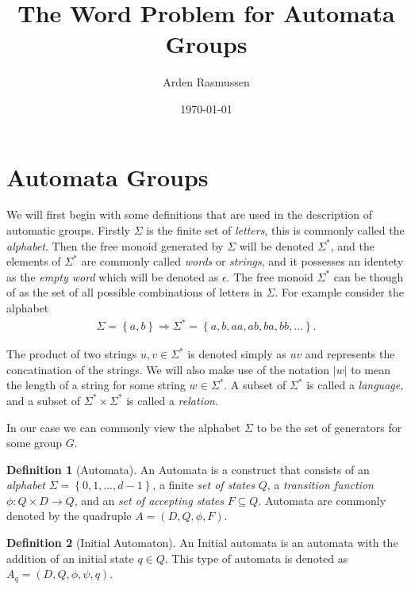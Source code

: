 \documentclass[10pt]{amsart}
\title{The Word Problem for Automata Groups}
\author{Arden Rasmussen}
\date{\today}
\theoremstyle{definition}
\newtheorem{definition}{Definition}[section]
\begin{document}
\maketitle

\section{Automata Groups}%
\label{sec:automata_groups}

We will first begin with some definitions that are used in the description of
automatic groups. Firstly $\Sigma$ is the finite set of \textit{letters}, this
is commonly called the \textit{alphabet}. Then the free monoid generated by
$\Sigma$ will be denoted $\Sigma^*$, and the elements of $\Sigma^*$ are
commonly called \textit{words} or \textit{strings}, and it possesses an
identety as the \textit{empty word} which will be denoted as $\epsilon$. The
free monoid $\Sigma^*$ can be though of as the set of all possible combinations
of letters in $\Sigma$. For example consider the alphabet
\begin{align*}
  \Sigma=\left\{a,b\right\}\Rightarrow\Sigma^*=\left\{a,b,aa,ab,ba,bb,\ldots\right\}.
\end{align*}

The product of two strings $u,v\in\Sigma^*$ is denoted simply as $uv$ and
represents the concatination of the strings. We will also make use of the
notation $|w|$ to mean the length of a string for some string $w\in\Sigma^*$. A
subset of $\Sigma^*$ is called a \textit{language}, and a subset of
$\Sigma^*\times\Sigma^*$ is called a \textit{relation}.

In our case we can commonly view the alphabet $\Sigma$ to be the set of
generators for some group $G$.

\begin{definition}[Automata]\label{def:automata}
  An Automata is a construct that consists of an \textit{alphabet}
  $\Sigma=\left\{0,1,\ldots,d-1\right\}$, a finite \textit{set of states}
  $Q$, a \textit{transition function} $\phi:Q\times D\rightarrow Q$, and an
  \textit{set of accepting states} $F\subseteq Q$. Automata are commonly
  denoted by the quadruple $A=\left(D,Q,\phi,F\right)$.
\end{definition}

\begin{definition}[Initial Automaton]\label{def:init_automata}
  An Initial automata is an automata with the addition of an initial state
  $q\in Q$. This type of automata is denoted as
  $A_q=\left(D,Q,\phi,\psi,q\right)$.
\end{definition}
\end{document}
